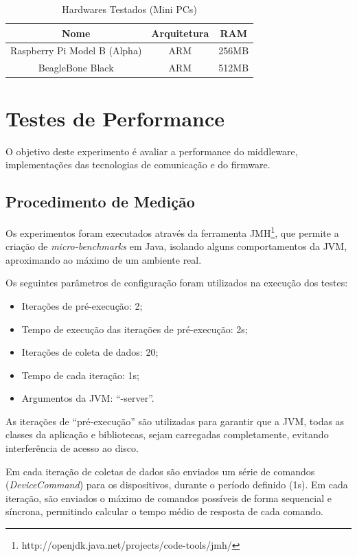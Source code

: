 \begin{table}[h]
\begin{centering}
\begin{tabular}{|c|c|c|}
\hline 
Nome & Arquitetura & RAM \tabularnewline
\hline 
\hline 
Raspberry Pi Model B (Alpha) & ARM & 256MB\tabularnewline
\hline 
BeagleBone Black & ARM & 512MB\tabularnewline
\hline 
\end{tabular}
\par\end{centering}
\caption{Hardwares Testados (Mini PCs)\label{tab:HardwaresTestados2}}
\end{table}


\section{Testes de Performance\label{sec:Testes-de-Performance}}

O objetivo deste experimento é avaliar a performance do middleware,
implementações das tecnologias de comunicação e do firmware.

\subsection{Procedimento de Medição}

Os experimentos foram executados através da ferramenta JMH\footnote{http://openjdk.java.net/projects/code-tools/jmh/},
que permite a criação de \emph{micro-benchmarks} em Java, isolando
alguns comportamentos da JVM, aproximando ao máximo de um ambiente
real. 

Os seguintes parâmetros de configuração foram utilizados na execução
dos testes:
\begin{itemize}
\item Iterações de pré-execução: 2;
\item Tempo de execução das iterações de pré-execução: 2s;
\item Iterações de coleta de dados: 20;
\item Tempo de cada iteração: 1s;
\item Argumentos da JVM: ``-server''.
\end{itemize}
As iterações de ``pré-execução'' são utilizadas para garantir que
a JVM, todas as classes da aplicação e bibliotecas, sejam carregadas
completamente, evitando interferência de acesso ao disco. 

Em cada iteração de coletas de dados são enviados um série de comandos
(\emph{DeviceCommand}) para os dispositivos, durante o período definido
(1s). Em cada iteração, são enviados o máximo de comandos possíveis
de forma sequencial e síncrona, permitindo calcular o tempo médio
de resposta de cada comando.

